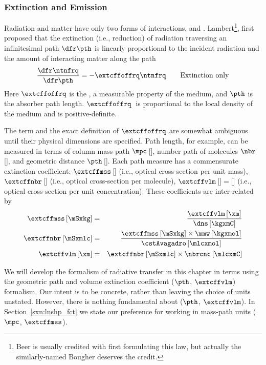 \documentclass[12pt]{article}
\begin{document}
\subsubsection[Extinction and Emission]{Extinction and Emission}\label{sxn:ext}
Radiation and matter have only two forms of interactions,
 and .
Lambert\footnote{Beer is usually credited with first formulating this
law, but actually the similarly-named Bougher deserves the credit.},
first proposed that the extinction (i.e., reduction) of radiation 
traversing an infinitesimal path $\dfr\pth$ is linearly proportional
to the incident radiation and the amount of interacting matter along
the path
\begin{equation}
\frac{\dfr\ntnfrq}{\dfr\pth} = -\extcffoffrq \ntnfrq \qquad\mathrm{Extinction\ only}
\label{eqn:ext_dfn}
\end{equation}
Here $\extcffoffrq$ is the , a
measurable property of the medium, and $\pth$ is the absorber path 
length. 
$\extcffoffrq$~is proportional to the local density of the medium and
is positive-definite.

The term  and the exact definition of
$\extcffoffrq$ are somewhat ambiguous until their physical dimensions
are specified.   
Path length, for example, can be measured in terms of 
column mass path $\mpc$\,[\kgxmS],  
number path of molecules $\nbr$\,[\nbrxmS],
and geometric distance $\pth$\,[\m]. 
Each path measure has a commensurate extinction coefficient: 
 $\extcffmss$\,[\mSxkg] 
(i.e., optical cross-section per unit mass), 
 $\extcffnbr$\,[\mSxmlc] 
(i.e., optical cross-section per molecule), 
 $\extcffvlm$\,[\mSxmC]$=$[\xm]
(i.e., optical cross-section per unit concentration).
These coefficients are inter-related by 
\begin{eqnarray}
\extcffmss\,\mbox{[\mSxkg]} & = & \frac{\extcffvlm\,\mbox{[\xm]}}{\dns\,\mbox{[\kgxmC]}} \nonumber \\
\extcffnbr\,\mbox{[\mSxmlc]} & = & \frac{\extcffmss\,\mbox{[\mSxkg]} \times \mmw\,\mbox{[\kgxmol]}}{\cstAvagadro\,\mbox{[\mlcxmol]}} \nonumber \\
\extcffvlm\,\mbox{[\xm]} & = & \extcffnbr\,\mbox{[\mSxmlc]} \times \nbrcnc\,\mbox{[\mlcxmC]}
\label{eqn:np}
\end{eqnarray}

We will develop the formalism of radiative transfer in this chapter 
in terms using the geometric path and volume extinction coefficient 
($\pth$, $\extcffvlm$) formalism. 
Our intent is to be concrete, rather than leaving the choice of units
unstated. 
However, there is nothing fundamental about ($\pth$, $\extcffvlm$).
In Section~\ref{sxn:lnshp_fct} we state our preference for working in 
mass-path units ($\mpc$, $\extcffmss$).
\end{document}

